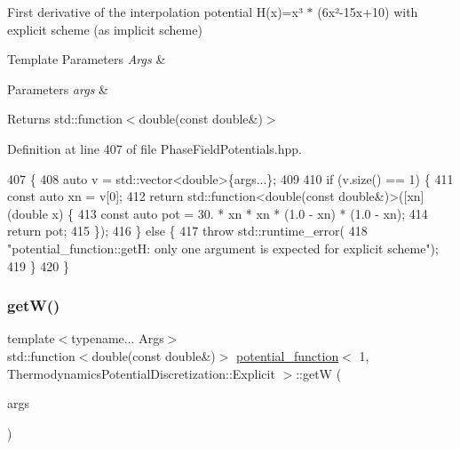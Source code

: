 First derivative of the interpolation potential H(x)=x³ $\ast$ (6x²-\/15x+10) with explicit scheme (as implicit scheme) 


\begin{DoxyTemplParams}{Template Parameters}
{\em Args} & \\
\hline
\end{DoxyTemplParams}

\begin{DoxyParams}{Parameters}
{\em args} & \\
\hline
\end{DoxyParams}
\begin{DoxyReturn}{Returns}
std\+::function$<$double(const double\&)$>$ 
\end{DoxyReturn}


Definition at line 407 of file Phase\+Field\+Potentials.\+hpp.


\begin{DoxyCode}
407                                                         \{
408     \textcolor{keyword}{auto} v = std::vector<double>\{args...\};
409 
410     \textcolor{keywordflow}{if} (v.size() == 1) \{
411       \textcolor{keyword}{const} \textcolor{keyword}{auto} xn = v[0];
412       \textcolor{keywordflow}{return} std::function<double(const double&)>([xn](\textcolor{keywordtype}{double} x) \{
413         \textcolor{keyword}{const} \textcolor{keyword}{auto} pot = 30. * xn * xn * (1.0 - xn) * (1.0 - xn);
414         \textcolor{keywordflow}{return} pot;
415       \});
416     \} \textcolor{keywordflow}{else} \{
417       \textcolor{keywordflow}{throw} std::runtime\_error(
418           \textcolor{stringliteral}{"potential\_function::getH: only one argument is expected for explicit scheme"});
419     \}
420   \}
\end{DoxyCode}
\mbox{\label{structpotential__function_3_011_00_01ThermodynamicsPotentialDiscretization_1_1Explicit_01_4_a83b90abf5c35bfe033a38d32ad812db1}} 
\subsubsection{\texorpdfstring{get\+W()}{getW()}}
{\footnotesize\ttfamily template$<$typename... Args$>$ \\
std\+::function$<$double(const double\&)$>$ \hyperlink{structpotential__function}{potential\+\_\+function}$<$ 1, Thermodynamics\+Potential\+Discretization\+::\+Explicit $>$\+::getW (\begin{DoxyParamCaption}\item[{Args...}]{args }\end{DoxyParamCaption})\hspace{0.3cm}{\ttfamily [inline]}}



